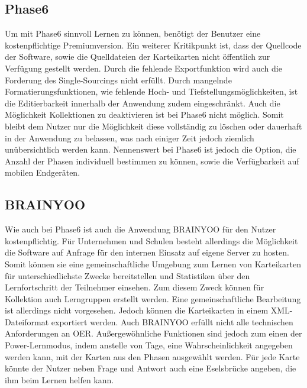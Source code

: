 \subsection{Phase6}
Um mit Phase6 \cite{phase6} sinnvoll Lernen zu können, benötigt der Benutzer eine kostenpflichtige Premiumversion. Ein weiterer Kritikpunkt ist, dass der Quellcode der Software, sowie die Quelldateien der Karteikarten nicht öffentlich zur Verfügung gestellt werden. Durch die fehlende Exportfunktion wird auch die Forderung des Single-Sourcings nicht erfüllt. Durch mangelnde Formatierungsfunktionen, wie fehlende Hoch- und Tiefstellungsmöglichkeiten, ist die Editierbarkeit innerhalb der Anwendung zudem eingeschränkt.
Auch die Möglichkeit Kollektionen zu deaktivieren ist bei Phase6 nicht möglich. Somit bleibt dem Nutzer nur die Möglichkeit diese vollständig zu löschen oder dauerhaft in der Anwendung zu belassen, was nach einiger Zeit jedoch ziemlich unübersichtlich werden kann. Nennenswert bei Phase6 ist jedoch die Option, die Anzahl der Phasen individuell bestimmen zu können, sowie die Verfügbarkeit auf mobilen Endgeräten.\\


\subsection{BRAINYOO}
Wie auch bei Phase6 ist auch die Anwendung BRAINYOO \cite{brainyoo} für den Nutzer kostenpflichtig. Für Unternehmen und Schulen besteht allerdings die Möglichkeit die Software auf Anfrage für den internen Einsatz auf eigene Server zu hosten. Somit können sie eine gemeinschaftliche Umgebung zum Lernen von Karteikarten für unterschiedlichste Zwecke bereitstellen und Statistiken über den Lernfortschritt der Teilnehmer einsehen. Zum diesem Zweck können für Kollektion auch Lerngruppen erstellt werden. Eine gemeinschaftliche Bearbeitung ist allerdings nicht vorgesehen. Jedoch können die Karteikarten in einem XML-Dateiformat exportiert werden. Auch BRAINYOO erfüllt nicht alle technischen Anforderungen an OER.
Außergewöhnliche Funktionen sind jedoch zum einen der Power-Lernmodus, indem anstelle von Tage, eine Wahrscheinlichkeit angegeben werden kann, mit der Karten aus den Phasen ausgewählt werden. Für jede Karte könnte der Nutzer neben Frage und Antwort auch eine Eselsbrücke angeben, die ihm beim Lernen helfen kann.

